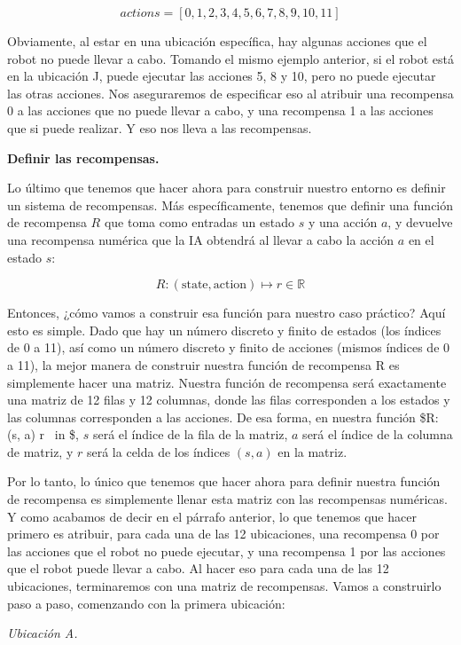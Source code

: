 \documentclass[]{book}
\begin{document}
\[actions = [0,1,2,3,4,5,6,7,8,9,10,11]\]

Obviamente, al estar en una ubicación específica, hay algunas acciones que el robot no puede llevar a cabo. Tomando el mismo ejemplo anterior, si el robot está en la ubicación J, puede ejecutar las acciones 5, 8 y 10, pero no puede ejecutar las otras acciones. Nos aseguraremos de especificar eso al atribuir una recompensa 0 a las acciones que no puede llevar a cabo, y una recompensa 1 a las acciones que si puede realizar. Y eso nos lleva a las recompensas.

\textbf{Definir las recompensas.}

Lo último que tenemos que hacer ahora para construir nuestro entorno es definir un sistema de recompensas. Más específicamente, tenemos que definir una función de recompensa \(R\) que toma como entradas un estado \(s\) y una acción \(a\), y devuelve una recompensa numérica que la IA obtendrá al llevar a cabo la acción \(a\) en el estado \(s\):

\[R : (\textrm{state}, \textrm{action}) \mapsto r \in \mathbb{R}\]

Entonces, ¿cómo vamos a construir esa función para nuestro caso práctico? Aquí esto es simple. Dado que hay un número discreto y finito de estados (los índices de 0 a 11), así como un número discreto y finito de acciones (mismos índices de 0 a 11), la mejor manera de construir nuestra función de recompensa R es simplemente hacer una matriz. Nuestra función de recompensa será exactamente una matriz de 12 filas y 12 columnas, donde las filas corresponden a los estados y las columnas corresponden a las acciones. De esa forma, en nuestra función \$R: (s, a) \mapsto r ~in  \$, \(s\) será el índice de la fila de la matriz, \(a\) será el índice de la columna de matriz, y \(r\) será la celda de los índices \((s, a)\) en la matriz.

Por lo tanto, lo único que tenemos que hacer ahora para definir nuestra función de recompensa es simplemente llenar esta matriz con las recompensas numéricas. Y como acabamos de decir en el párrafo anterior, lo que tenemos que hacer primero es atribuir, para cada una de las 12 ubicaciones, una recompensa 0 por las acciones que el robot no puede ejecutar, y una recompensa 1 por las acciones que el robot puede llevar a cabo. Al hacer eso para cada una de las 12 ubicaciones, terminaremos con una matriz de recompensas. Vamos a construirlo paso a paso, comenzando con la primera ubicación:

\emph{Ubicación A.}
\end{document}
